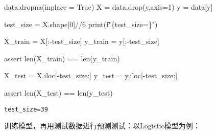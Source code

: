 \documentclass[
  letterpaper,
  DIV=11,
  numbers=noendperiod]{scrreprt}
\newenvironment{Shaded}{\begin{snugshade}}{\end{snugshade}}
\newcommand{\BuiltInTok}[1]{\textcolor[rgb]{0.00,0.23,0.31}{#1}}
\newcommand{\ControlFlowTok}[1]{\textcolor[rgb]{0.00,0.23,0.31}{#1}}
\newcommand{\DecValTok}[1]{\textcolor[rgb]{0.68,0.00,0.00}{#1}}
\newcommand{\NormalTok}[1]{\textcolor[rgb]{0.00,0.23,0.31}{#1}}
\newcommand{\OperatorTok}[1]{\textcolor[rgb]{0.37,0.37,0.37}{#1}}
\newcommand{\SpecialCharTok}[1]{\textcolor[rgb]{0.37,0.37,0.37}{#1}}
\newcommand{\SpecialStringTok}[1]{\textcolor[rgb]{0.13,0.47,0.30}{#1}}
\newcommand{\StringTok}[1]{\textcolor[rgb]{0.13,0.47,0.30}{#1}}
\newcommand{\VariableTok}[1]{\textcolor[rgb]{0.07,0.07,0.07}{#1}}
\begin{document}
\begin{Shaded}
\begin{Highlighting}[]
\NormalTok{data.dropna(inplace }\OperatorTok{=} \VariableTok{True}\NormalTok{)}
\NormalTok{X }\OperatorTok{=}\NormalTok{ data.drop(}\StringTok{\textquotesingle{}y\textquotesingle{}}\NormalTok{,axis}\OperatorTok{=}\DecValTok{1}\NormalTok{)}
\NormalTok{y }\OperatorTok{=}\NormalTok{ data[}\StringTok{\textquotesingle{}y\textquotesingle{}}\NormalTok{]}

\NormalTok{test\_size }\OperatorTok{=}\NormalTok{ X.shape[}\DecValTok{0}\NormalTok{]}\OperatorTok{//}\DecValTok{6}
\BuiltInTok{print}\NormalTok{(}\SpecialStringTok{f"}\SpecialCharTok{\{}\NormalTok{test\_size}\OperatorTok{=}\SpecialCharTok{\}}\SpecialStringTok{"}\NormalTok{)}

\NormalTok{X\_train }\OperatorTok{=}\NormalTok{ X[:}\OperatorTok{{-}}\NormalTok{test\_size]}
\NormalTok{y\_train }\OperatorTok{=}\NormalTok{ y[:}\OperatorTok{{-}}\NormalTok{test\_size]}

\ControlFlowTok{assert} \BuiltInTok{len}\NormalTok{(X\_train) }\OperatorTok{==} \BuiltInTok{len}\NormalTok{(y\_train)}

\NormalTok{X\_test }\OperatorTok{=}\NormalTok{ X.iloc[}\OperatorTok{{-}}\NormalTok{test\_size:]}
\NormalTok{y\_test }\OperatorTok{=}\NormalTok{ y.iloc[}\OperatorTok{{-}}\NormalTok{test\_size:]}

\ControlFlowTok{assert} \BuiltInTok{len}\NormalTok{(X\_test) }\OperatorTok{==} \BuiltInTok{len}\NormalTok{(y\_test)}
\end{Highlighting}
\end{Shaded}

\begin{verbatim}
test_size=39
\end{verbatim}

训练模型，再用测试数据进行预测测试：以Logistic模型为例：
\end{document}
